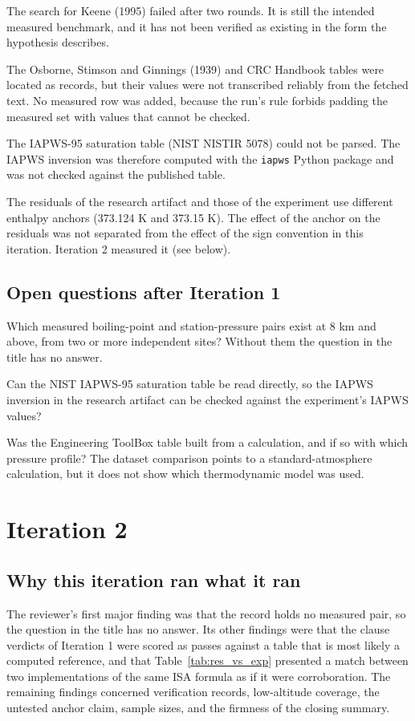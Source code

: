 \documentclass[11pt,letterpaper]{article}
\begin{document}
The search for Keene (1995) failed after two rounds. It is still the intended measured benchmark, and it has not been verified as existing in the form the hypothesis describes.

The Osborne, Stimson and Ginnings (1939) and CRC Handbook tables were located as records, but their values were not transcribed reliably from the fetched text. No measured row was added, because the run's rule forbids padding the measured set with values that cannot be checked.

The IAPWS-95 saturation table (NIST NISTIR 5078) could not be parsed. The IAPWS inversion was therefore computed with the \texttt{iapws} Python package and was not checked against the published table.

The residuals of the research artifact and those of the experiment use different enthalpy anchors (373.124 K and 373.15 K). The effect of the anchor on the residuals was not separated from the effect of the sign convention in this iteration. Iteration 2 measured it (see below).

\subsection{Open questions after Iteration 1}

Which measured boiling-point and station-pressure pairs exist at 8 km and above, from two or more independent sites? Without them the question in the title has no answer.

Can the NIST IAPWS-95 saturation table be read directly, so the IAPWS inversion in the research artifact can be checked against the experiment's IAPWS values?

Was the Engineering ToolBox table built from a calculation, and if so with which pressure profile? The dataset comparison points to a standard-atmosphere calculation, but it does not show which thermodynamic model was used.

\section{Iteration 2}\label{sec:it2}

\subsection{Why this iteration ran what it ran}

The reviewer's first major finding was that the record holds no measured pair, so the question in the title has no answer. Its other findings were that the clause verdicts of Iteration 1 were scored as passes against a table that is most likely a computed reference, and that Table~\ref{tab:res_vs_exp} presented a match between two implementations of the same ISA formula as if it were corroboration. The remaining findings concerned verification records, low-altitude coverage, the untested anchor claim, sample sizes, and the firmness of the closing summary.
\end{document}
